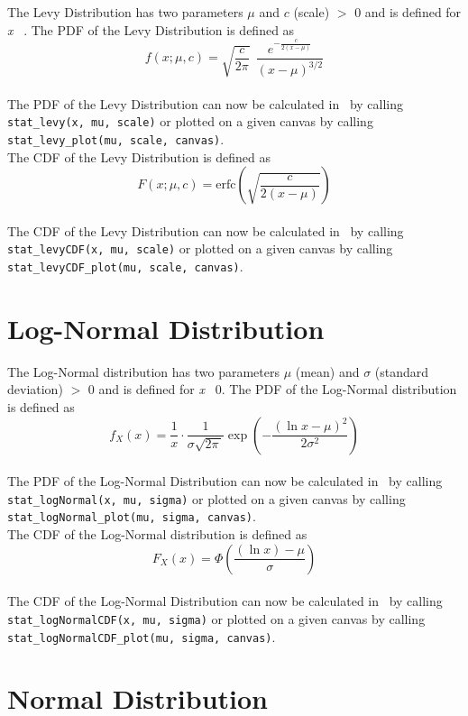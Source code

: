		The Levy Distribution has two parameters $\mu$ and $c$ (scale) $>$ 0 and is defined for \textit{x} \geq\ \mu. The \ac{PDF} of the Levy Distribution is defined as
		\\
		$$f(x;\mu,c)=\sqrt{\frac{c}{2\pi}}~~\frac{e^{ -\frac{c}{2(x-\mu)}}} {(x-\mu)^{3/2}}$$
		\\[0.3cm]
		The \ac{PDF} of the Levy Distribution can now be calculated in \setlx\ by calling \lstinline{stat_levy(x, mu, scale)} or plotted on a given canvas by calling \lstinline{stat_levy_plot(mu, scale, canvas)}.
		\\[0.3cm]
		The \ac{CDF} of the Levy Distribution is defined as
		\\
		$$F(x;\mu,c)=\textrm{erfc}\left(\sqrt{\frac{c}{2(x-\mu)}}\right)$$
		\\[0.3cm]
		The \ac{CDF} of the Levy Distribution can now be calculated in \setlx\ by calling \lstinline{stat_levyCDF(x, mu, scale)} or plotted on a given canvas by calling \lstinline{stat_levyCDF_plot(mu, scale, canvas)}.

	\section{Log-Normal Distribution}
	
		The Log-Normal distribution has two parameters $\mu$ (mean) and $\sigma$ (standard deviation) $>$ 0 and is defined for \textit{x} \geq\ 0. The \ac{PDF} of the Log-Normal distribution is defined as
		\\
		$$f_X(x) = \frac 1 x \cdot \frac 1 {\sigma\sqrt{2\pi\,}} \exp\left( -\frac{(\ln x-\mu)^2}{2\sigma^2} \right)$$
		\\[0.3cm]
		The \ac{PDF} of the Log-Normal Distribution can now be calculated in \setlx\ by calling \lstinline{stat_logNormal(x, mu, sigma)} or plotted on a given canvas by calling \lstinline{stat_logNormal_plot(mu, sigma, canvas)}.
		\\[0.3cm]
		The \ac{CDF} of the Log-Normal distribution is defined as
		\\
		$$F_X(x) = \Phi\left( \frac{(\ln x) - \mu} \sigma \right)$$
		\\[0.3cm]
		The \ac{CDF} of the Log-Normal Distribution can now be calculated in \setlx\ by calling \lstinline{stat_logNormalCDF(x, mu, sigma)} or plotted on a given canvas by calling \lstinline{stat_logNormalCDF_plot(mu, sigma, canvas)}.

	\section{Normal Distribution}
	
